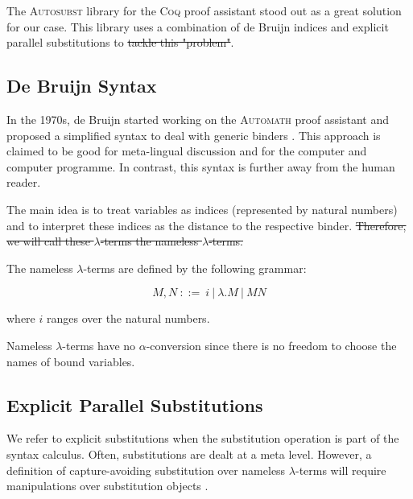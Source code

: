 The \textsc{Autosubst} library for the \textsc{Coq} proof assistant stood out as a great solution for our case. 
This library uses a combination of de Bruijn indices and explicit parallel substitutions to \sout{tackle this "problem"}.


\subsection{De Bruijn Syntax}

\cite{deBruijn} \cite{AutosubstSchafer}

In the 1970s, de Bruijn started working on the \textsc{Automath} proof assistant and proposed a simplified syntax to deal with generic binders \cite{deBruijn}.
This approach is claimed to be good for meta-lingual discussion and for the computer and computer programme. In contrast, this syntax is further away from the human reader.

The main idea is to treat variables as indices (represented by natural numbers) and to interpret these indices as the distance to the respective binder.
\sout{Therefore, we will call these $\lambda$-terms the nameless $\lambda$-terms.}

\begin{definition}
  The nameless $\lambda$-terms are defined by the following grammar:

  \[ M, N \ ::= \ i \ | \ \lambda . M \ | \ M N \]

  where $i$ ranges over the natural numbers.
\end{definition}

\begin{remark}
  Nameless $\lambda$-terms have no $\alpha$-conversion since there is no freedom to choose the names of bound variables.
\end{remark}

\subsection{Explicit Parallel Substitutions}

\cite{AutosubstSchafer}

We refer to explicit substitutions \cite{Abadi} when the substitution operation is part of the syntax calculus.
Often, substitutions are dealt at a meta level.
However, a definition of capture-avoiding substitution over nameless $\lambda$-terms will require manipulations over substitution objects \cite{deBruijn}.

